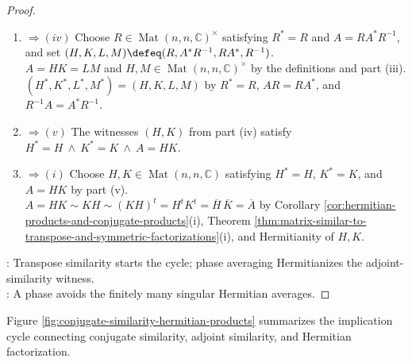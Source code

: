 \begin{theorem}
\begin{proof}
\begin{enumerate}[label=(\roman*)]
For such $\theta$, $H_{\theta}\in\operatorname{Mat}(n,n,\mathbb{C})^\times$, $H_{\theta}^*=H_{\theta}$, and $A=H_{\theta}A^*H_{\theta}^{-1}$ by the preceding identities.
\item[$(iii)$]$\Rightarrow (iv)$ Choose $R\in\operatorname{Mat}(n,n,\mathbb{C})^\times$ satisfying $R^*=R$ and $A=RA^*R^{-1}$, and set $(H,K,L,M)\defeq(R,A^*R^{-1},RA^*,R^{-1})$.\\
$A=HK=LM$ and $H,M\in\operatorname{Mat}(n,n,\mathbb{C})^\times$ by the definitions and part (iii).\\
$(H^*,K^*,L^*,M^*)=(H,K,L,M)$ by $R^*=R$, $AR=RA^*$, and $R^{-1}A=A^*R^{-1}$.
\item[$(iv)$]$\Rightarrow (v)$ The witnesses $(H,K)$ from part (iv) satisfy $H^*=H\ \land\ K^*=K\ \land\ A=HK$.
\item[$(v)$]$\Rightarrow (i)$ Choose $H,K\in\operatorname{Mat}(n,n,\mathbb{C})$ satisfying $H^*=H$, $K^*=K$, and $A=HK$ by part (v).\\
$A=HK\sim KH\sim(KH)^t=H^tK^t=\overline{H}\,\overline{K}=\overline{A}$ by Corollary \ref{cor:hermitian-products-and-conjugate-products}(i), Theorem \ref{thm:matrix-similar-to-transpose-and-symmetric-factorizations}(i), and Hermitianity of $H,K$.
\end{enumerate}
: Transpose similarity starts the cycle; phase averaging Hermitianizes the adjoint-similarity witness.\\
: A phase avoids the finitely many singular Hermitian averages.
\end{proof}
\end{theorem}

Figure \ref{fig:conjugate-similarity-hermitian-products} summarizes the implication cycle connecting conjugate similarity, adjoint similarity, and Hermitian factorization.

\begin{illustrationfigure}[H]
  \centering
  
  \caption{Conjugate similarity, adjoint similarity, and Hermitian product factorisations are equivalent.}
  \label{fig:conjugate-similarity-hermitian-products}
\end{illustrationfigure}

